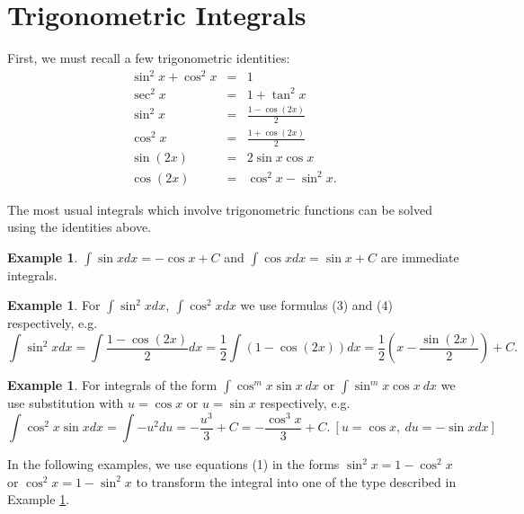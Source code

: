 \documentclass[12pt]{article}
\theoremstyle{definition}
\newtheorem{exa}[thm]{Example}
\begin{document}
\section{Trigonometric Integrals}

First, we must recall a few trigonometric identities:
\begin{eqnarray}
\sin^2x+\cos^2x &=& 1\\
\sec^2x &=& 1 + \tan^2 x\\
\sin^2x &=& \frac{1-\cos (2x)}{2}\\
\cos^2x &=& \frac{1+\cos(2x)}{2}\\
\sin(2x) &=& 2\sin x \cos x\\
\cos(2x) &=& \cos^2x - \sin^2 x.
\end{eqnarray}

The most usual integrals which involve trigonometric functions can
be solved using the identities above.

\begin{exa}
$\int \sin x dx = -\cos x +C$ and $\int \cos x dx = \sin x +C$ are
immediate integrals.
\end{exa}
\begin{exa}
For $\int \sin^2x dx,\ \int \cos^2x dx$ we use formulas (3) and
(4) respectively, e.g.
$$\int \sin^2x dx =\int \frac{1-\cos (2x)}{2} dx = \frac{1}{2}
\int (1 - \cos(2x)) dx =
\frac{1}{2}\left(x-\frac{\sin(2x)}{2}\right)+C.$$
\end{exa}
\begin{exa}
\label{combo} For integrals of the form $\int \cos^m x\sin x\ dx$
or $\int \sin^m x \cos x\ dx$ we use substitution with $u=\cos x$
or $u=\sin x$ respectively, e.g.
$$\int \cos^2x \sin x dx = \int -u^2
du = -\frac{u^3}{3} + C= -\frac{\cos^3 x}{3} +C.\ [u=\cos x,\
du=-\sin x dx]$$
\end{exa}

In the following examples, we use equations (1) in the forms
$\sin^2x=1-\cos^2x$ or $\cos^2x=1-\sin^2x$ to transform the
integral into one of the type described in Example \ref{combo}.
\end{document}
